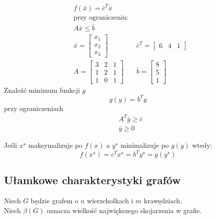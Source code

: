 \begin{problem*}
\begin{align*}
&f(\bar{x})=\bar{c}^T \bar{x}\\
&\text{przy ograniczeniu: }\\
&A\bar{x}\leq \bar{b}\\
&\bar{x} = \begin{bmatrix}
x_1\\x_2\\x_3
\end{bmatrix} & \bar{c}^T = \begin{bmatrix}
6&4&1
\end{bmatrix}\\
&A=\begin{bmatrix}
3&2&1\\1&2&1\\1&0&1
\end{bmatrix} & \bar{b}=\begin{bmatrix}
8\\5\\1
\end{bmatrix}
\end{align*}
Znaleźć minimum funkcji $g$
$$g(y)=b^Ty$$
przy ograniczeniach
\begin{align*}
&A^T\bar{y}\geq \bar{c}\\
&\bar{y} \geq 0
\end{align*}
\end{problem*}

\begin{theorem}
Jeśli $x^\star$ maksymalizuje po $f(x)$ a $y^\star$ minimalizuje po $g(y)$ wtedy:
$$f(x^\star)=c^Tx^\star =b^Ty^\star =g(y^\star)$$
\end{theorem}

\subsection{Ułamkowe charakterystyki grafów}
\begin{definition}[$\beta (G)$]
Niech $G$ będzie grafem o $n$ wierzchołkach i $m$ krawędziach.\\Niech $\beta (G)$ oznacza wielkość największego skojarzenia w grafie.
\end{definition}

